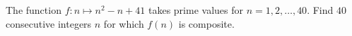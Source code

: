 The function $f : n \mapsto n^2 - n + 41$ takes prime values for $n = 1, 2, \ldots, 40$. Find $40$ consecutive integers $n$ for which $f(n)$ is composite.
